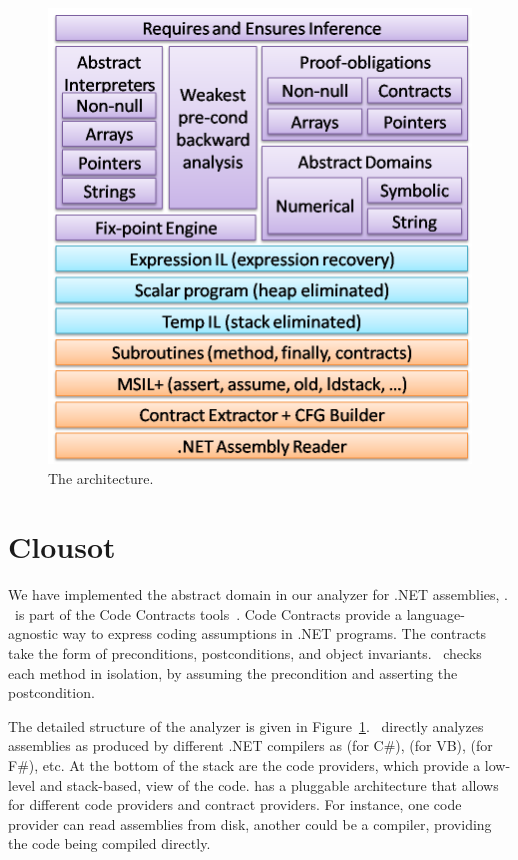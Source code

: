 \documentclass{elsart}
\begin{document}
\begin{figure}
\centering
\includegraphics[scale=.5]{Architecture.png}
\caption{The \Clousot{} architecture.}
\label{fig:architecture}
\end{figure}




\section{Clousot}
We have implemented the abstract domain \Pentagons{} in our analyzer for .NET assemblies, \Clousot. 
\Clousot\ is part of the Code Contracts tools~\cite{CodeContracts}.
Code Contracts provide a language-agnostic way to express coding assumptions in .NET programs.
The contracts take the form of preconditions, postconditions, and object invariants. 
\Clousot\ checks each method in isolation, by assuming the precondition and asserting the postcondition.

The detailed structure of the analyzer is given in Figure~\ref{fig:architecture}.
\Clousot\ directly analyzes assemblies as produced by different .NET compilers as  (for C\#),  (for VB),  (for F\#), etc.
At the bottom of the stack are the code providers, which provide a
low-level and stack-based, view of the code.  \Clousot{} has a
pluggable architecture that allows for different code providers and
contract providers.  For instance, one code provider can read
assemblies from disk, another could be a compiler, providing the code
being compiled directly.
\end{document}
